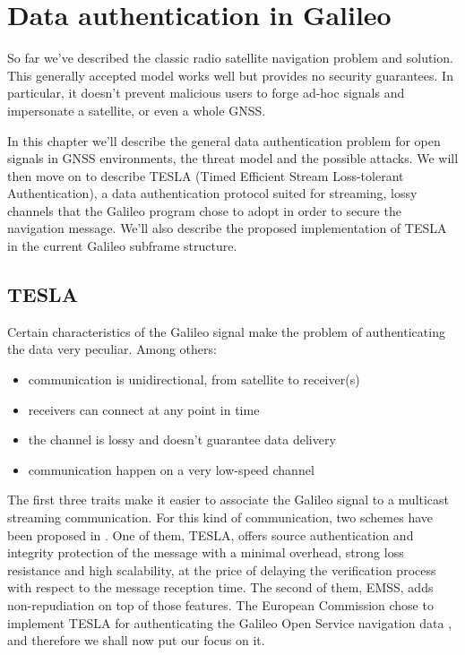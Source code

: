 
\chapter{Data authentication in Galileo}
\label{ch:data_auth}

So far we've described the classic radio satellite navigation problem and
solution. This generally accepted model works well but provides no security
guarantees. In particular, it doesn't prevent malicious users to forge ad-hoc
signals and impersonate a satellite, or even a whole GNSS.

In this chapter we'll describe the general data authentication problem for open
signals in GNSS environments, the threat model and the possible attacks. We will
then move on to describe TESLA (Timed Efficient Stream Loss-tolerant
Authentication), a data authentication protocol suited for streaming, lossy
channels that the Galileo program chose to adopt in order to secure the
navigation message. We'll also describe the proposed implementation of TESLA in
the current Galileo subframe structure.

\section{TESLA}
Certain characteristics of the Galileo signal make the problem of authenticating
the data very peculiar. Among others:
\begin{itemize}
  \item communication is unidirectional, from satellite to receiver(s)
  \item receivers can connect at any point in time
  \item the channel is lossy and doesn't guarantee data delivery
  \item communication happen on a very low-speed channel
\end{itemize}
The first three traits make it easier to associate the Galileo signal to a
multicast streaming communication. For this kind of communication, two schemes
have been proposed in \cite{perrig}. One of them, TESLA, offers source
authentication and integrity protection of the message with a minimal overhead,
strong loss resistance and high scalability, at the price of delaying the
verification process with respect to the message reception time. The second of
them, EMSS, adds non-repudiation on top of those features. The European
Commission chose to implement TESLA for authenticating the Galileo Open Service
navigation data \cite{osnma}, and therefore we shall now put our focus on it.

